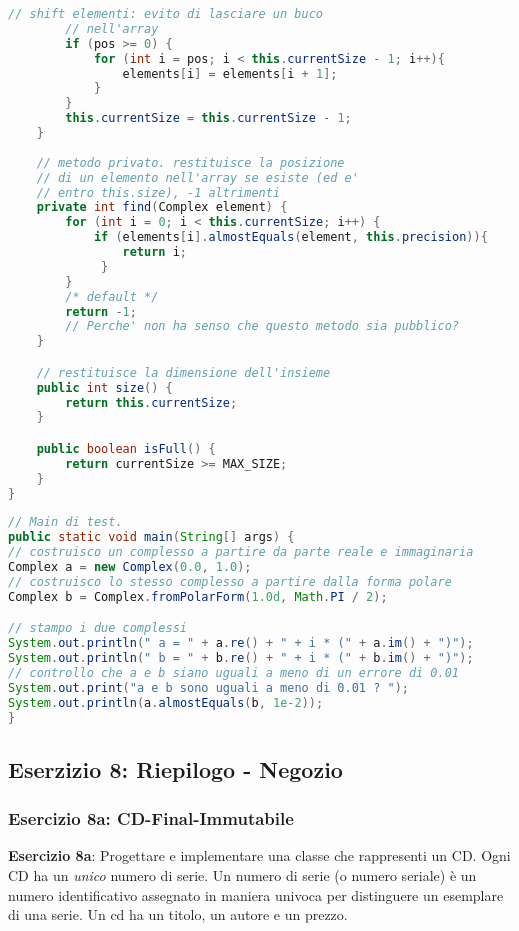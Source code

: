 \documentclass{article}
\begin{document}
\begin{lstlisting}[language=Java,escapechar=|]
	    // shift elementi: evito di lasciare un buco
	    // nell'array
	    if (pos >= 0) {
	        for (int i = pos; i < this.currentSize - 1; i++){
	            elements[i] = elements[i + 1];
	        }
	    }
		this.currentSize = this.currentSize - 1;
    }
    
    // metodo privato. restituisce la posizione
    // di un elemento nell'array se esiste (ed e'
    // entro this.size), -1 altrimenti
    private int find(Complex element) {
        for (int i = 0; i < this.currentSize; i++) {
            if (elements[i].almostEquals(element, this.precision)){
                return i;
             }
	    }
    	/* default */
	    return -1;
	    // Perche' non ha senso che questo metodo sia pubblico?
    }

    // restituisce la dimensione dell'insieme
    public int size() {
	    return this.currentSize;
    }

    public boolean isFull() {
	    return currentSize >= MAX_SIZE;
    }
}
\end{lstlisting}

\begin{lstlisting}[language=Java,escapechar=|]
// Main di test.
public static void main(String[] args) {
// costruisco un complesso a partire da parte reale e immaginaria
Complex a = new Complex(0.0, 1.0);
// costruisco lo stesso complesso a partire dalla forma polare
Complex b = Complex.fromPolarForm(1.0d, Math.PI / 2);

// stampo i due complessi
System.out.println(" a = " + a.re() + " + i * (" + a.im() + ")");
System.out.println(" b = " + b.re() + " + i * (" + b.im() + ")");
// controllo che a e b siano uguali a meno di un errore di 0.01
System.out.print("a e b sono uguali a meno di 0.01 ? ");
System.out.println(a.almostEquals(b, 1e-2));
}

\end{lstlisting}

\subsection{Eserzizio 8: Riepilogo - Negozio}
\subsubsection{Esercizio 8a: CD-Final-Immutabile}
\begin{framed}
\textbf{Esercizio 8a}: Progettare e implementare una classe che rappresenti un CD. Ogni CD ha un \emph{unico} numero di serie. Un numero di serie (o numero seriale) è un numero identificativo assegnato in maniera univoca per distinguere un esemplare di una serie. Un cd ha un titolo, un autore e un prezzo.
\end{framed}
\end{document}
